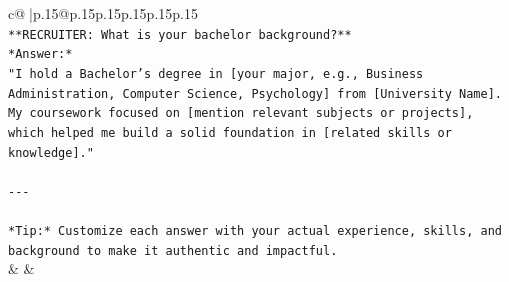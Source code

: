 \documentclass{article}
\begin{document}
{\begin{supertabular}{c@{$\;$}|p{.15\linewidth}@{}p{.15\linewidth}p{.15\linewidth}p{.15\linewidth}p{.15\linewidth}p{.15\linewidth}}
{{{\\ 
\texttt{**RECRUITER: What is your bachelor background?**  } \\
\texttt{*Answer:*  } \\
\texttt{"I hold a Bachelor’s degree in {[}your major, e.g., Business Administration, Computer Science, Psychology{]} from {[}University Name{]}. My coursework focused on {[}mention relevant subjects or projects{]}, which helped me build a solid foundation in {[}related skills or knowledge{]}."} \\
\\ 
\texttt{{-}{-}{-}} \\
\\ 
\texttt{*Tip:* Customize each answer with your actual experience, skills, and background to make it authentic and impactful.} \\
            }
        }
    }
    & & \\ \\


\end{supertabular}}
\end{document}
